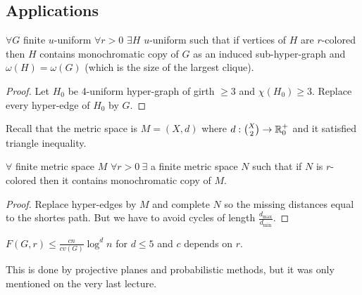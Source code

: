 \subsection{Applications}

\begin{thm}[Folkman]
	$\forall G$ finite $u$-uniform $\forall r > 0$ $\exists H$ $u$-uniform such that if vertices of $H$ are $r$-colored then $H$ contains monochromatic copy of $G$ as an induced sub-hyper-graph and $\omega(H) = \omega(G)$ (which is the size of the largest clique).
\end{thm}

\begin{proof}
	Let $H_0$ be 4-uniform hyper-graph of girth $\geq 3$ and $\chi(H_0) \geq 3$. Replace every hyper-edge of $H_0$ by $G$.
\end{proof}

\begin{defn}
	Recall that the metric space is $M = (X, d)$ where $d : \binom{X}{2} \to \mathbb{R}^+_0$ and it satisfied triangle inequality.
\end{defn}

\begin{thm}
	$\forall$ finite metric space $M$ $\forall r > 0 \ \exists$ a finite metric space $N$ such that if $N$ is $r$-colored then it contains monochromatic copy of $M$.
\end{thm}

\begin{proof}
	Replace hyper-edges by $M$ and complete $N$ so the missing distances equal to the shortes path. But we have to avoid cycles of length $\frac{d_{\max}}{d_{\min}}$.
\end{proof}

\begin{thm}
	$F(G,r) \leq \frac{cn}{cv(G)} \log^d n$ for $d \leq 5$ and $c$ depends on $r$.
\end{thm}

This is done by projective planes and probabilistic methods, but it was only mentioned on the very last lecture.
